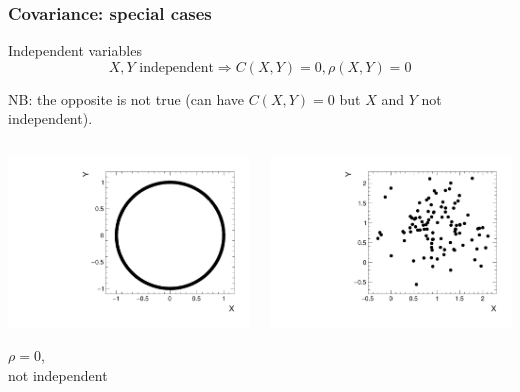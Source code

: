 \documentclass[9pt]{beamer}
\begin{document}
\begin{frame}
 \frametitle{Covariance: special cases}
 
 \begin{block}{Independent variables}
  $$X,Y \text{ independent} \Rightarrow C(X,Y) =0, \rho(X,Y) = 0$$
  
  NB: the opposite is not true (can have $C(X,Y)=0$ but $X$ and $Y$ not independent).
 \end{block}
 
 \begin{columns}
  \begin{column}{0.27\textwidth}
   \includegraphics[width=\textwidth]{circle}

   \centering
   $\rho=0$,\\ not independent
  \end{column}
  \begin{column}{0.27\textwidth}
   \includegraphics[width=\textwidth]{uncor}
   

\end{column}
\end{columns}
\end{frame}
\end{document}
